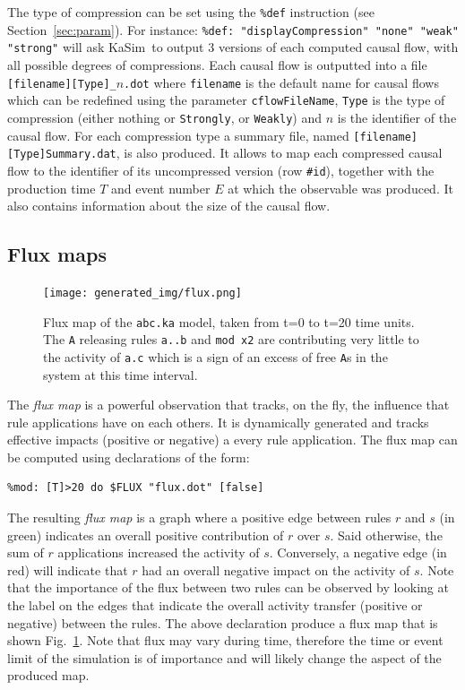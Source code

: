\documentclass[11pt]{book}
\def\KaSim{\textsf{KaSim}}
\def\ttt#1{\texttt{#1}}
\begin{document}
The type of compression can be set using the \texttt{\%def} instruction (see Section~\ref{sec:param}). For instance:
\lstinline[language=kappa]!%def: "displayCompression" "none" "weak" "strong"!
will ask \KaSim~to output 3 versions of each computed causal flow, with all possible degrees of compressions. Each causal flow is outputted into a file \texttt{[filename][Type]\_$n$.dot} where \texttt{filename} is the default name for causal flows which can be redefined using the parameter \texttt{cflowFileName}, \texttt{Type} is the type of compression (either nothing or \texttt{Strongly}, or \texttt{Weakly}) and $n$ is the identifier of the causal flow. For each compression type a summary file, named \texttt{[filename][Type]Summary.dat}, is also produced. It allows to map each compressed causal flow to the identifier of its uncompressed version (row \texttt{\#id}), together with the production time $T$ and event number $E$ at which the observable was produced. It also contains information about the size of the causal flow.

\subsection{Flux maps}

\begin{figure}[p] %
   \centering
\texttt{[image: generated\_img/flux.png]}
   \caption{Flux map of the \ttt{abc.ka} model, taken from t=0 to t=20 time units. The \ttt{A} releasing rules \ttt{a..b} and \ttt{mod x2} are contributing very little to the activity of \ttt{a.c} which is a sign of an excess of free \ttt{A}s in the system at this time interval.}
   \label{fig:flux}
\end{figure}
The \emph{flux map} is a powerful observation that tracks, on the fly, the influence that rule applications have on each others. It is dynamically generated and tracks effective impacts (positive or negative) a every rule application. The flux map can be computed using declarations of the form:
\begin{lstlisting}[language=kappa]
%mod: [true] do $FLUX "flux.dot" [true]
%mod: [T]>20 do $FLUX "flux.dot" [false]
\end{lstlisting}
The resulting \emph{flux map} is a graph where a positive edge between rules $r$ and $s$ (in green) indicates an overall positive contribution of $r$ over $s$. Said otherwise, the sum of $r$ applications increased the activity of $s$. Conversely, a negative edge (in red) will indicate that $r$ had an overall negative impact on the activity of $s$. Note that the importance of the flux between two rules can be observed by looking at the label on the edges that indicate the overall activity transfer (positive or negative) between the rules. The above declaration produce a flux map that is shown Fig.~\ref{fig:flux}. Note that flux may vary during time, therefore the time or event limit of the simulation is of importance and will likely change the aspect of the produced map.
\end{document}
